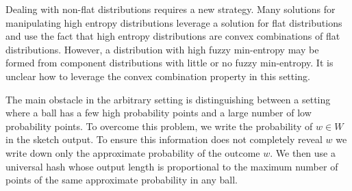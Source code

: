\documentclass[11pt]{article}
\begin{document}
Dealing with non-flat distributions requires a new strategy. 
Many solutions for manipulating high entropy distributions leverage a solution for flat distributions and use the fact that high entropy distributions are convex combinations of flat distributions.  However, a distribution with high fuzzy min-entropy may be formed from component distributions with little or no fuzzy min-entropy.  It is unclear how to leverage the convex combination property in this setting.  

The main obstacle in the arbitrary setting is distinguishing between a setting where a ball has a few high probability points and a large number of low probability points.
To overcome this problem, we write the probability of $w\in W$ in the sketch output.  To ensure this information does not completely reveal $w$ we write down only the approximate probability of the outcome $w$. We then use a universal hash whose output length is proportional to the maximum number of points of the same approximate probability in any ball.  
\end{document}

